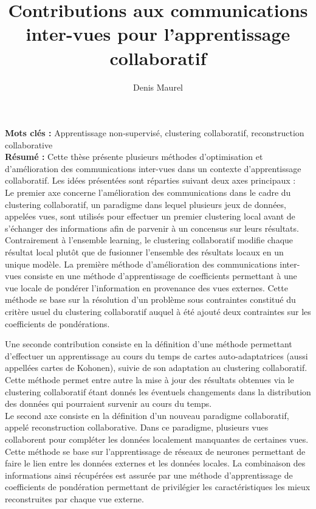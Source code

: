 \documentclass[a4paper]{article}
\begin{document}
\title{Contributions aux communications inter-vues pour l'apprentissage collaboratif}
\author{Denis Maurel}
\maketitle

\textbf{Mots clés :} \quad Apprentissage non-supervisé, clustering collaboratif, reconstruction collaborative\\%


\textbf{Résumé :} \quad Cette thèse présente plusieurs méthodes d'optimisation et d'amélioration des communications inter-vues dans un contexte d'apprentissage collaboratif. Les idées présentées sont réparties suivant deux axes principaux : \\%

Le premier axe concerne l'amélioration des communications dans le cadre du clustering collaboratif, un paradigme dans lequel plusieurs jeux de données, appelées vues, sont utilisés pour effectuer un premier clustering local avant de s'échanger des informations afin de parvenir à un concensus sur leurs résultats. Contrairement à l'ensemble learning, le clustering collaboratif modifie chaque résultat local plutôt que de fusionner l'ensemble des résultats locaux en un unique modèle. La première méthode d'amélioration des communications inter-vues consiste en une méthode d'apprentissage de coefficients permettant à une vue locale de pondérer l'information en provenance des vues externes. Cette méthode se base sur la résolution d'un problème sous contraintes constitué du critère usuel du clustering collaboratif auquel à été ajouté deux contraintes sur les coefficients de pondérations.

Une seconde contribution consiste en la définition d'une méthode permettant d'effectuer un apprentissage au cours du temps de cartes auto-adaptatrices (aussi appellées cartes de Kohonen), suivie de son adaptation au clustering collaboratif. Cette méthode permet entre autre la mise à jour des résultats obtenues via le clustering collaboratif étant donnés les éventuels changements dans la distribution des données qui pourraient survenir au cours du temps.\\

Le second axe consiste en la définition d'un nouveau paradigme collaboratif, appelé reconstruction collaborative. Dans ce paradigme, plusieurs vues collaborent pour compléter les données localement manquantes de certaines vues. Cette méthode se base sur l'apprentissage de réseaux de neurones permettant de faire le lien entre les données externes et les données locales. La combinaison des informations ainsi récupérées est assurée par une méthode d'apprentissage de coefficients de pondération permettant de privilégier les caractéristiques les mieux reconstruites par chaque vue externe.
\end{document}
